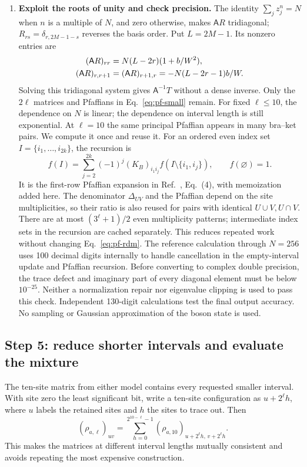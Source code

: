 \begin{enumerate}
\item \textbf{Exploit the roots of unity and check precision.}
The identity $\sum_jz_j^n=N$ when $n$ is a multiple of $N$, and zero
otherwise, makes $\mathsf A R$ tridiagonal; $R_{rs}=\delta_{r,2M-1-s}$
reverses the basis order. Put $L=2M-1$. Its nonzero entries are
\begin{align}
 (\mathsf A R)_{rr}&=N(L-2r)(1+b/W^2),\notag\\
 (\mathsf A R)_{r,r+1}&=(\mathsf A R)_{r+1,r}
 =-N(L-2r-1)b/W.
\end{align}
Solving this tridiagonal system gives $\mathsf A^{-1}T$ without a dense
inverse. Only the $2\ell$ matrices and Pfaffians in
Eq.~\eqref{eq:pf-small} remain. For fixed $\ell\leq10$, the dependence
on $N$ is linear; the dependence on interval length is still exponential.
At $\ell=10$ the same principal Pfaffian appears in many bra--ket
pairs. We compute it once and reuse it. For an ordered even index set
$I=\{i_1,\ldots,i_{2k}\}$, the recursion is
\begin{equation}
 f(I)=\sum_{j=2}^{2k}(-1)^j(K_B)_{i_1i_j}
 f(I\setminus\{i_1,i_j\}),\qquad f(\varnothing)=1.
\end{equation}
It is the first-row Pfaffian expansion in Ref.~\cite{Wimmer}, Eq.~(4),
with memoization added here. The denominator
$\Delta_{UV}$ and the Pfaffian depend on the site multiplicities, so
their ratio is also reused for pairs with identical $U\cup V,U\cap V$.
There are at most $(3^\ell+1)/2$ even multiplicity patterns; intermediate
index sets in the recursion are cached separately. This reduces repeated
work without changing Eq.~\eqref{eq:pf-rdm}.
The reference calculation through $N=256$ uses 100 decimal digits internally to handle cancellation in
the empty-interval update and Pfaffian recursion. Before converting to
complex double precision, the trace defect and imaginary part of every
diagonal element must be below $10^{-25}$. Neither a normalization repair
nor eigenvalue clipping is used to pass this check. Independent 130-digit
calculations test the final output accuracy. No sampling or Gaussian
approximation of the boson state is used.
\end{enumerate}

\subsection{Step 5: reduce shorter intervals and evaluate the mixture}
\label{sec:interval-entropy}
The ten-site matrix from either model contains every requested smaller
interval. With site zero the least significant bit, write a ten-site
configuration as $u+2^\ell h$, where $u$ labels the retained sites and
$h$ the sites to trace out. Then
\begin{equation}
 (\rho_{a,\ell})_{uv}=\sum_{h=0}^{2^{10-\ell}-1}
 (\rho_{a,10})_{u+2^\ell h,\,v+2^\ell h}.
 \label{eq:large-trace-short}
\end{equation}
This makes the matrices at different interval lengths mutually
consistent and avoids repeating the most expensive construction.

